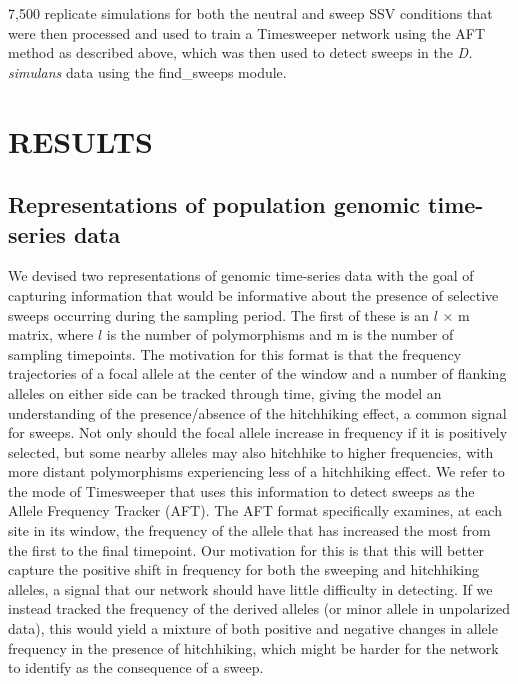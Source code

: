 7,500 replicate simulations for both the neutral and sweep SSV conditions that were then processed and used to train a Timesweeper network using the AFT method as described above, which was then used to detect sweeps in the \textit{D. simulans} data using the find\_sweeps module.

\newpage
\section{RESULTS}
\subsection{Representations of population genomic time-series data}

We devised two representations of genomic time-series data with the goal of capturing information that would be informative about the presence of selective sweeps occurring during the sampling period. The first of these is an $l$ × m matrix, where $l$ is the number of polymorphisms and m is the number of sampling timepoints. The motivation for this format is that the frequency trajectories of a focal allele at the center of the window and a number of flanking alleles on either side can be tracked through time, giving the model an understanding of the presence/absence of the hitchhiking effect, a common signal for sweeps. Not only should the focal allele increase in frequency if it is positively selected, but some nearby alleles may also hitchhike to higher frequencies, with more distant polymorphisms experiencing less of a hitchhiking effect. We refer to the mode of Timesweeper that uses this information to detect sweeps as the Allele Frequency Tracker (AFT). The AFT format specifically examines, at each site in its window, the frequency of the allele that has increased the most from the first to the final timepoint. Our motivation for this is that this will better capture the positive shift in frequency for both the sweeping and hitchhiking alleles, a signal that our network should have little difficulty in detecting. If we instead tracked the frequency of the derived alleles (or minor allele in unpolarized data), this would yield a mixture of both positive and negative changes in allele frequency in the presence of hitchhiking, which might be harder for the network to identify as the consequence of a sweep. 
